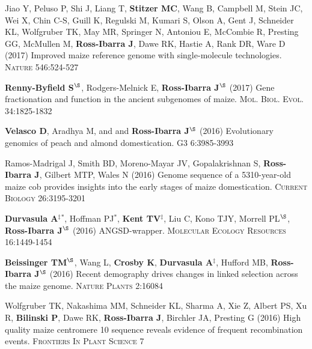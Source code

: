 \documentclass[letterpaper,10pt]{article}
\begin{document}
\begin{etaremune}
\item  Jiao Y, Peluso P,  Shi J,  Liang T, {\bf Stitzer MC}, Wang B,  Campbell M, Stein JC,  Wei X,  Chin C-S,  Guill K,  Regulski M,  Kumari S,  Olson A,  Gent J, Schneider KL,  Wolfgruber TK, May MR, Springer N,  Antoniou E,  McCombie R, Presting GG,  McMullen M, {\bf Ross-Ibarra J}, Dawe RK,  Hastie A, Rank DR, Ware D (2017) Improved maize reference genome with single-molecule technologies. \textsc{Nature}  546:524-527

\item  {\bf Renny-Byfield S}$^\S$, Rodgers-Melnick E, {\bf Ross-Ibarra J}$^\S$ (2017) Gene fractionation and function in the ancient subgenomes of maize. \textsc{Mol. Biol. Evol.} 34:1825-1832

\item {\bf Velasco D}, Aradhya M, and  and {\bf Ross-Ibarra J}$^\S$ (2016) Evolutionary genomics of peach and almond domestication. \textsc{G3} 6:3985-3993

\item Ramos-Madrigal J, Smith BD, Moreno-Mayar JV, Gopalakrishnan S, {\bf Ross-Ibarra J}, Gilbert MTP, Wales N (2016) Genome sequence of a 5310-year-old maize cob provides insights into the early stages of maize domestication. \textsc{Current Biology} 26:3195-3201

\item {\bf Durvasula A}$^\ddagger$$^*$,  Hoffman PJ$^*$, {\bf Kent TV}$^\ddagger$, Liu C, Kono TJY, Morrell PL$^\S$, {\bf Ross-Ibarra J}$^\S$ (2016) ANGSD-wrapper. \textsc{Molecular Ecology Resources} 16:1449-1454

\item {\bf Beissinger TM}$^\S$, Wang L, {\bf Crosby K}, {\bf Durvasula A}$^\ddagger$, Hufford MB, {\bf Ross-Ibarra J}$^\S$ (2016)  Recent demography drives changes in linked selection across the maize genome. \textsc{Nature Plants} 2:16084

\item Wolfgruber TK, Nakashima MM, Schneider KL, Sharma A, Xie Z, Albert PS, Xu R, {\bf Bilinski P},  Dawe RK, {\bf Ross-Ibarra J}, Birchler JA, Presting G (2016) High quality maize centromere 10 sequence reveals evidence of frequent recombination events. \textsc{Frontiers In Plant Science} 7


\end{etaremune}
\end{document}
